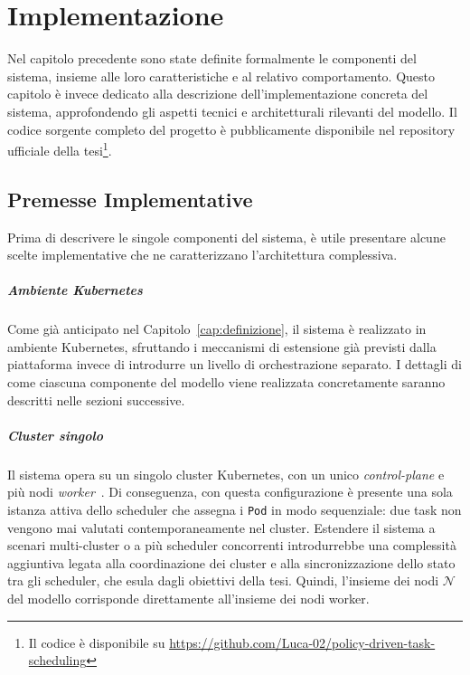 \chapter{Implementazione}
\label{cap:implementazione}

Nel capitolo precedente sono state definite formalmente le componenti del sistema, insieme alle loro caratteristiche e al relativo comportamento. Questo capitolo è invece dedicato alla descrizione dell'implementazione concreta del sistema, approfondendo gli aspetti tecnici e architetturali rilevanti del modello. Il codice sorgente completo del progetto è pubblicamente disponibile nel repository ufficiale della tesi\footnote{Il codice è disponibile su \url{https://github.com/Luca-02/policy-driven-task-scheduling}}.


\section{Premesse Implementative}
\label{sec:premesse_implementative}

Prima di descrivere le singole componenti del sistema, è utile presentare alcune scelte implementative che ne caratterizzano l'architettura complessiva.

\paragraph{Ambiente Kubernetes}
\label{impl:ambiente_k8s}

Come già anticipato nel Capitolo~\ref{cap:definizione}, il sistema è realizzato in ambiente Kubernetes, sfruttando i meccanismi di estensione già previsti dalla piattaforma invece di introdurre un livello di orchestrazione separato. I dettagli di come ciascuna componente del modello viene realizzata concretamente saranno descritti nelle sezioni successive.

\paragraph{Cluster singolo}
\label{impl:cluster_singolo}

Il sistema opera su un singolo cluster Kubernetes, con un unico \emph{control-plane} e più nodi \emph{worker}~\cite{k8s-architecture}. Di conseguenza, con questa configurazione è presente una sola istanza attiva dello scheduler che assegna i \texttt{Pod} in modo sequenziale: due task non vengono mai valutati contemporaneamente nel cluster. Estendere il sistema a scenari multi-cluster o a più scheduler concorrenti introdurrebbe una complessità aggiuntiva legata alla coordinazione dei cluster e alla sincronizzazione dello stato tra gli scheduler, che esula dagli obiettivi della tesi. Quindi, l'insieme dei nodi $\mathcal{N}$ del modello corrisponde direttamente all'insieme dei nodi worker.

